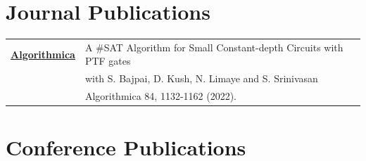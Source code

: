 \documentclass[a4paper,10pt]{article}
\begin{document}
\section{Journal Publications}

\begin{tabular}{p{2.5cm}|p{11cm}l}
  \href{https://link.springer.com/article/10.1007/s00453-021-00915-7}{{\bf Algorithmica}} & A \#SAT Algorithm for Small Constant-depth Circuits with PTF gates \\
  & with S. Bajpai, D. Kush, N. Limaye and S. Srinivasan \\
  & Algorithmica 84, 1132-1162 (2022).
\end{tabular}

\section{Conference Publications}
\end{document}
